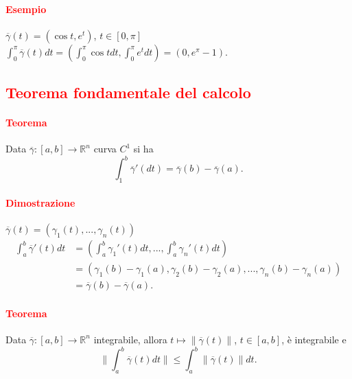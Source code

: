 \documentclass{article}
\newcommand{\R}{\mathbb{R}}
\begin{document}
\paragraph{\textcolor{red}{Esempio}}
$\overline{\gamma}(t)=(\cos t , e^t)$, $t \in [0,\pi]$\\
$\int_{0}^\pi \overline{\gamma}(t)dt=\left( \int_0^\pi \cos t dt, \int_0^\pi e^t dt \right)=(0,e^\pi-1)$.

\subsection{\textcolor{red}{Teorema fondamentale del calcolo}}
\paragraph{\textcolor{red}{Teorema}}
Data $\overline{\gamma}:[a,b]\rightarrow \R^n$ curva $C^1$ si ha
\begin{equation*}
    \int_1^b\overline{\gamma}'(dt)=\overline{\gamma}(b)-\overline{\gamma}(a).
\end{equation*}

\paragraph{\textcolor{red}{Dimostrazione}}
$\overline{\gamma}(t)=(\gamma_1(t),...,\gamma_n(t))$\\
\begin{align*}
    \int_a^b\overline{\gamma}'(t)dt&=\left( \int_a^b \gamma_1'(t)dt,...,\int_a^b \gamma_n'(t)dt \right)\\
    &=\left( \gamma_1(b)-\gamma_1(a),\gamma_2(b)-\gamma_2(a),...,\gamma_n(b)-\gamma_n(a)\right)\\
    &=\overline{\gamma}(b)-\overline{\gamma}(a).
\end{align*}
\begin{flushright}
    \Lightning
\end{flushright}

\paragraph{\textcolor{red}{Teorema}}
Data $\overline{\gamma}: [a,b]\rightarrow \R^n$ integrabile, allora $t \mapsto \|\overline{\gamma}(t)\|$, $t\in[a,b]$, è integrabile e 
\begin{equation*}
    \|\int_a^b\overline{\gamma}(t)dt\|\leq \int_a^b\|\overline{\gamma}(t)\|dt.
\end{equation*}
\end{document}
